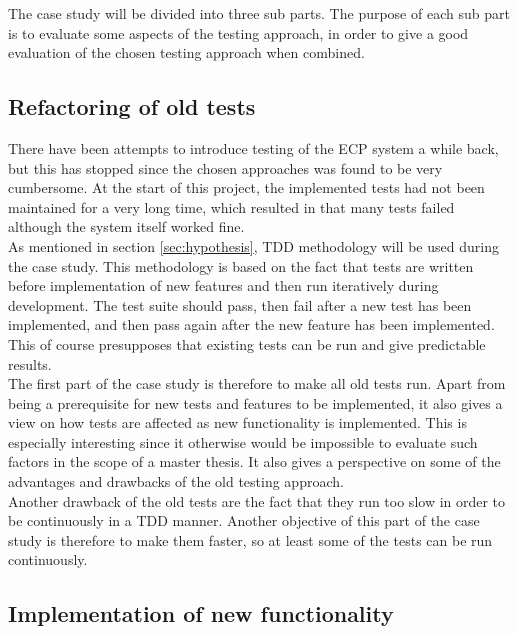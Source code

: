 
The case study will be divided into three sub parts. The purpose of each
sub part is to evaluate some aspects of the testing approach, in order
to give a good evaluation of the chosen testing approach when
combined.\\


\subsection{Refactoring of old tests}

There have been attempts to introduce testing of the ECP system a while
back, but this has stopped since the chosen approaches was found to be
very cumbersome. At the start of this project, the implemented tests had
not been maintained for a very long time, which resulted in that many
tests failed although the system itself worked fine.\\

As mentioned in section \ref{sec:hypothesis}, TDD methodology will be
used during the case study. This methodology is based on the fact that
tests are written before implementation of new features and then run
iteratively during development. The test suite should pass, then fail
after a new test has been implemented, and then pass again after the new
feature has been implemented. This of course presupposes that existing
tests can be run and give predictable results.\\

The first part of the case study is therefore to make all old tests run.
Apart from being a prerequisite for new tests and features to be
implemented, it also gives a view on how tests are affected as new
functionality is implemented. This is especially interesting since it
otherwise would be impossible to evaluate such factors in the scope of a
master thesis. It also gives a perspective on some of the advantages
and drawbacks of the old testing approach.\\

Another drawback of the old tests are the fact that they run too slow in
order to be continuously in a TDD manner. Another objective of this part
of the case study is therefore to make them faster, so at least some of
the tests can be run continuously.\\


\subsection{Implementation of new functionality}

